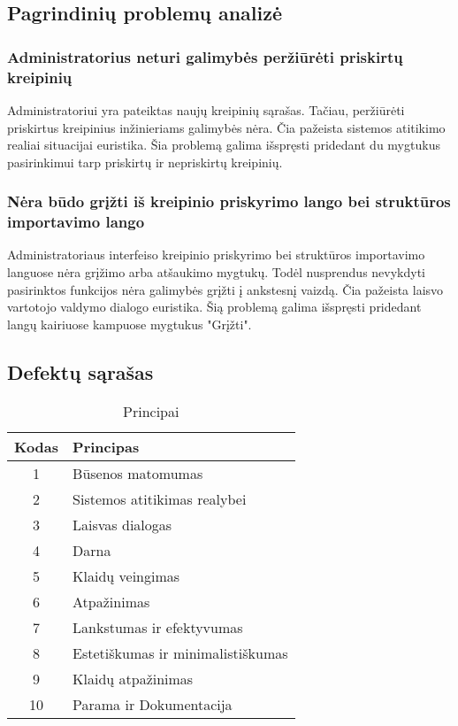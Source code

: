 \subsection{Pagrindinių problemų analizė}
	
	\subsubsection{Administratorius neturi galimybės peržiūrėti priskirtų kreipinių}
		
		Administratoriui yra pateiktas naujų kreipinių sąrašas.
		Tačiau, peržiūrėti priskirtus kreipinius inžinieriams galimybės nėra.
		Čia pažeista sistemos atitikimo realiai situacijai euristika.
		Šia problemą galima išspręsti pridedant du mygtukus pasirinkimui tarp priskirtų ir nepriskirtų kreipinių.
		
	\subsubsection{Nėra būdo grįžti iš kreipinio priskyrimo lango bei struktūros importavimo lango}
	
		Administratoriaus interfeiso kreipinio priskyrimo bei struktūros importavimo languose nėra grįžimo arba atšaukimo mygtukų.
		Todėl nusprendus nevykdyti pasirinktos funkcijos nėra galimybės grįžti į ankstesnį vaizdą.
		Čia pažeista laisvo vartotojo valdymo dialogo euristika.
		Šią problemą galima išspręsti pridedant langų kairiuose kampuose mygtukus "Grįžti".
	
\subsection{Defektų sąrašas}
	\begin{table}[ht] 
		\caption{Principai} %
		\centering %
		\begin{tabular}{c l} %
			\hline\hline %
			Kodas & Principas\\ [0.5ex] %
			\hline %
			1 & Būsenos matomumas \\
			2 & Sistemos atitikimas realybei \\
			3 & Laisvas dialogas \\
			4 & Darna \\
			5 & Klaidų veingimas \\
			6 & Atpažinimas \\
			7 & Lankstumas ir efektyvumas \\
			8 & Estetiškumas ir minimalistiškumas \\
			9 & Klaidų atpažinimas \\
			10 & Parama ir Dokumentacija \\
			\hline %
		\end{tabular} 
		\label{table:nonlin} %
	\end{table} 

